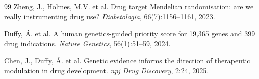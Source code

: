 \documentclass[11pt]{article}
\begin{document}
\begin{thebibliography}{99}
Zheng, J., Holmes, M.V. et al.
\newblock Drug target Mendelian randomisation: are we really instrumenting drug use?
\newblock \emph{Diabetologia}, 66(7):1156--1161, 2023.

Duffy, \'{A}. et al.
\newblock A human genetics-guided priority score for 19,365 genes and 399 drug indications.
\newblock \emph{Nature Genetics}, 56(1):51--59, 2024.

Chen, J., Duffy, \'{A}. et al.
\newblock Genetic evidence informs the direction of therapeutic modulation in drug development.
\newblock \emph{npj Drug Discovery}, 2:24, 2025.

\end{thebibliography}
\end{document}
